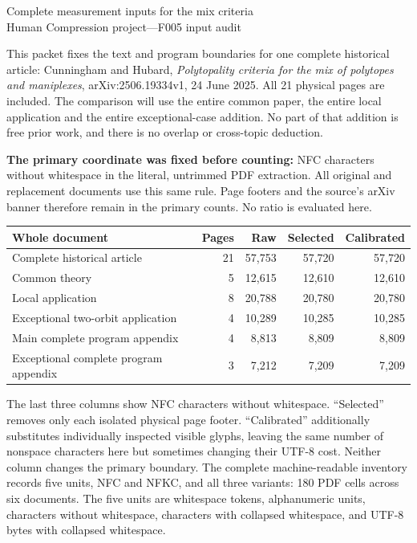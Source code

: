 \documentclass[a4paper,11pt]{article}
\begin{document}
\begin{center}{\Large Complete measurement inputs for the mix criteria}\\[4pt]
Human Compression project\quad---\quad F005 input audit\end{center}

This packet fixes the text and program boundaries for one complete historical
article: Cunningham and Hubard, \emph{Polytopality criteria for the mix of
polytopes and maniplexes}, arXiv:2506.19334v1, 24 June 2025. All 21 physical pages
are included. The comparison will use the entire common paper, the entire local
application and the entire exceptional-case addition. No part of that addition
is free prior work, and there is no overlap or cross-topic deduction.

\textbf{The primary coordinate was fixed before counting:} NFC characters
without whitespace in the literal, untrimmed PDF extraction. All original and
replacement documents use this same rule. Page footers and the source's arXiv
banner therefore remain in the primary counts. No ratio is evaluated here.

\begin{center}\small
\begin{tabular}{@{}p{64mm}rrrr@{}}\toprule
Whole document & Pages & Raw & Selected & Calibrated\\\midrule
Complete historical article & 21 & 57,753 & 57,720 & 57,720 \\
Common theory & 5 & 12,615 & 12,610 & 12,610 \\
Local application & 8 & 20,788 & 20,780 & 20,780 \\
Exceptional two-orbit application & 4 & 10,289 & 10,285 & 10,285 \\
Main complete program appendix & 4 & 8,813 & 8,809 & 8,809 \\
Exceptional complete program appendix & 3 & 7,212 & 7,209 & 7,209 \\
\bottomrule\end{tabular}\end{center}

The last three columns show NFC characters without whitespace. ``Selected''
removes only each isolated physical page footer. ``Calibrated'' additionally
substitutes individually inspected visible glyphs, leaving the same number of
nonspace characters here but sometimes changing their UTF-8 cost. Neither
column changes the primary boundary. The complete machine-readable inventory
records five units, NFC and NFKC, and all three variants: 180 PDF cells across
six documents. The five units are whitespace tokens, alphanumeric units,
characters without whitespace, characters with collapsed whitespace, and
UTF-8 bytes with collapsed whitespace.
\end{document}
